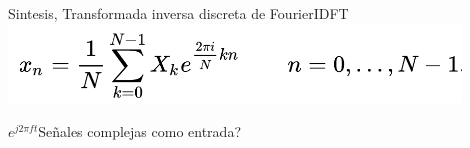  \begin{frame}{Sintesis, Transformada inversa discreta de Fourier}{IDFT}
    \center\includegraphics[width=0.9\textwidth]{3_clase/idft_eq}
    \vfill
 \end{frame}

\begin{frame}{$e^{j2\pi ft}$}{Señales complejas como entrada?}
   \handsonicon
   \begin{columns}[c]
      \hspace{2pt}
      \begin{column}{.5\textwidth}
         
      \end{column}
      \hspace{2pt}
      \vrule
      \hspace{2pt}
      \begin{column}{.5\textwidth}
         
      \end{column}
   \end{columns}
   \vfill
\end{frame}

